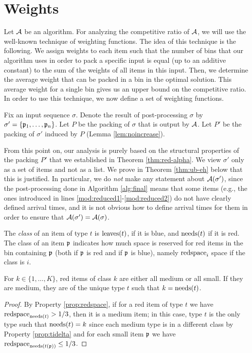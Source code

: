 \section{Weights}
Let $\mathcal{A}$ be an {\EHarm} algorithm.
For analyzing the competitive ratio of $\mathcal{A}$, we will use the well-known technique of weighting functions. The idea of this technique is the following. We assign weights to each item such that the number of bins that our algorithm uses in order to pack a specific input is equal (up to an additive constant) to the sum of the weights of all items in this input. Then, we determine the average weight that can be packed in a bin in the optimal solution. This average weight for a single bin gives us an upper bound on the competitive ratio. In order to use this technique, we now define a set of weighting functions.

Fix an input sequence $\sigma.$
Denote the result of post-processing $\sigma$ by $\sigma'=\{\mathfrak{p}_1,\dots,\mathfrak{p}_n\}$. 
Let $P$ be the packing of $\sigma$ that is output by $\mathcal{A}$.
Let $P'$ be the packing of $\sigma'$ induced by $P$ (Lemma \ref{lem:noincrease}).

From this point on, our analysis is purely based on the structural properties of the packing $P'$ that we established in Theorem \ref{thm:red-alpha}. We view $\sigma'$ only as a set of items and not as a list. We prove in Theorem \ref{thm:ub-eh} below that this is justified. In particular, we do \emph{not} make any statement about $\mathcal{A}(\sigma')$, since the post-processing done in Algorithm \ref{alg:final} means that some items (e.g., the ones introduced in lines \ref{mod:reduced1}-\ref{mod:reduced2}) do not have clearly defined arrival times, and it is not obvious how to define arrival times for them in order to ensure that $\mathcal{A}(\sigma') = \mathcal{A}(\sigma)$.

The \emph{class}
of an item of type $t$ is $\mathrm{leaves}(t)$, if it is blue, and $\mathrm{needs}(t)$ if it is 
red.
The class of an item $\mathfrak{p}$ indicates how much space is reserved for red items in the bin containing $\mathfrak{p}$
(both if $\mathfrak{p}$ is red and if $\mathfrak{p}$ is blue), namely $\mathrm{redspace}_i$ space if the class is $i$.

\begin{lemma}
	\label{lem:allthesame}
	For $k\in\{1,\dots,K\}$, red items of class $k$ are either all medium or all small.
	If they are medium, they are of the unique type $t$ such that $k=\mathrm{needs}(t)$.
\end{lemma}
\begin{proof}
	By Property \ref{prop:redspace}, if for a red item of type $t$ we have
	$\mathrm{redspace}_{\mathrm{needs}(t)}>1/3$, then it is a medium item; in this case, 
	type $t$ is the only type such that
	$\mathrm{needs}(t)=k$ since each medium type is in a different class by Property \ref{prop:tidelta}
	and for each small item $\mathfrak{p}$ we have $\mathrm{redspace}_{\mathrm{needs}(t(\mathfrak{p}))}\le1/3$.
\end{proof}

